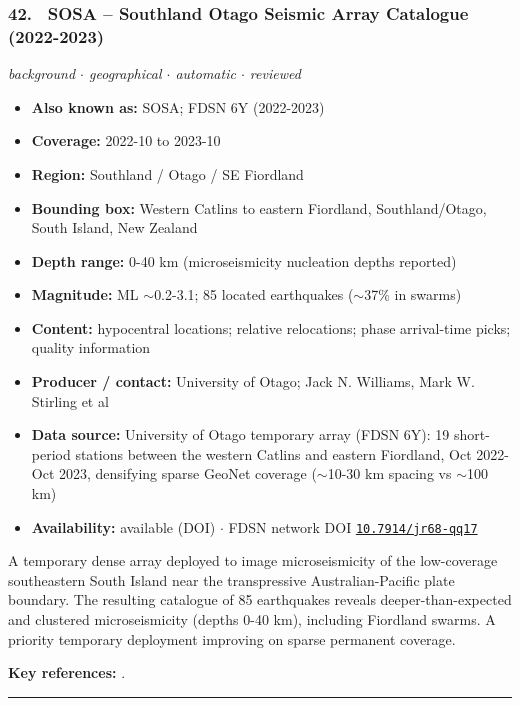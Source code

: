 \documentclass[10pt,a4paper]{article}
\newcommand{\catentryrule}{\par\vspace{3pt}\noindent\textcolor{rulegrey}{\rule{\linewidth}{0.3pt}}\par\vspace{5pt}}
\newcommand{\kv}[2]{\item \textbf{#1:} #2}
\begin{document}
\subsubsection*{\hypertarget{c:42}{42.}~ SOSA -- Southland Otago Seismic Array Catalogue (2022-2023)}
{\small\itshape background $\cdot$ geographical $\cdot$ automatic $\cdot$ reviewed}\par\vspace{2pt}
\begin{itemize}[leftmargin=1.3em,itemsep=0.6pt,topsep=1pt,parsep=0pt]
\kv{Also known as}{SOSA; FDSN 6Y (2022-2023)}
\kv{Coverage}{2022-10 to 2023-10}
\kv{Region}{Southland / Otago / SE Fiordland}
\kv{Bounding box}{Western Catlins to eastern Fiordland, Southland/Otago, South Island, New Zealand}
\kv{Depth range}{0-40 km (microseismicity nucleation depths reported)}
\kv{Magnitude}{ML $\sim$0.2-3.1; 85 located earthquakes ($\sim$37\% in swarms)}
\kv{Content}{hypocentral locations; relative relocations; phase arrival-time picks; quality information}
\kv{Producer / contact}{University of Otago; Jack N. Williams, Mark W. Stirling et al}
\kv{Data source}{University of Otago temporary array (FDSN 6Y): 19 short-period stations between the western Catlins and eastern Fiordland, Oct 2022-Oct 2023, densifying sparse GeoNet coverage ($\sim$10-30 km spacing vs $\sim$100 km)}
\kv{Availability}{available (DOI) $\cdot$ FDSN network DOI \href{https://doi.org/10.7914/jr68-qq17}{\nolinkurl{10.7914/jr68-qq17}}}
\end{itemize}
\par\vspace{2pt}A temporary dense array deployed to image microseismicity of the low-coverage southeastern South Island near the transpressive Australian-Pacific plate boundary. The resulting catalogue of 85 earthquakes reveals deeper-than-expected and clustered microseismicity (depths 0-40 km), including Fiordland swarms. A priority temporary deployment improving on sparse permanent coverage.
\par\vspace{2pt}\textbf{Key references:} \cite{Williams2025,UniversityofOtago2022}.
\catentryrule
\end{document}

